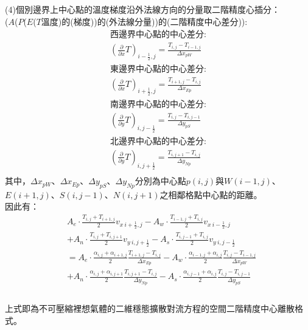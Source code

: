 \documentclass[12pt]{article}
\begin{document}
\noindent (4)個別邊界上中心點的溫度梯度沿外法線方向的分量取二階精度心插分：\\
\noindent ($A$($P$($E$($T$溫度)的(梯度))的(外法線分量))的(二階精度中心差分)):
\begin{equation}
  \begin{split}
    \mbox{西邊界中心點的中心差分:}\\
    (\frac{\partial}{\partial x} T)_{i-\frac{1}{2},j} = \frac{T_{i,j}-T_{i-1,j}}{\Delta x_{pW}} \\
    \mbox{東邊界中心點的中心差分:}\\
    (\frac{\partial}{\partial x} T)_{i+\frac{1}{2},j} = \frac{T_{i+1,j}-T_{i,j}}{\Delta x_{Ep}} \\
    \mbox{南邊界中心點的中心差分:}\\
    (\frac{\partial}{\partial y} T)_{i,j-\frac{1}{2}} = \frac{T_{i,j}-T_{i,j-1}}{\Delta y_{pS}} \\
    \mbox{北邊界中心點的中心差分:}\\
    (\frac{\partial}{\partial y} T)_{i,j+\frac{1}{2}} = \frac{T_{i,j+1}-T_{i,j}}{\Delta y_{Np}} \\
  \end{split}
\end{equation}
\noindent 其中，$\Delta x_{pW}$、$\Delta x_{Ep}$、$\Delta y_{pS}$、$\Delta y_{Np}$分別為中心點$p(i,j)$與$W(i-1,j)$、$E(i+1,j)$、$S(i,j-1)$、$N(i,j+1)$之相鄰格點中心點的距離。\\
\noindent 因此有：
\begin{equation}
\begin{split}
  &A_{e} \cdot \frac{T_{i,j} + T_{i+1,j}}{2} v_{x\ i+\frac{1}{2},j} - A_{w} \cdot \frac{T_{i-1,j} + T_{i,j}}{2} v_{x\ i-\frac{1}{2},j} \\
  &+ A_{n} \cdot \frac{T_{i,j} + T_{i,j+1}}{2} v_{y\ i,j+\frac{1}{2}} - A_{s} \cdot \frac{T_{i,j-1} + T_{i,j}}{2} v_{y\ i,j-\frac{1}{2}}\\
  &= A_{e} \cdot \frac{\alpha_{i,j} + \alpha_{i+1,j}}{2}\frac{T_{i+1,j}-T_{i,j}}{\Delta x_{Ep}}- A_{w} \cdot \frac{\alpha_{i-1,j} + \alpha_{i,j}}{2}\frac{T_{i,j}-T_{i-1,j}}{\Delta x_{pW}} \\
  &+ A_{n} \cdot \frac{\alpha_{i,j} + \alpha_{i,j+1}}{2}\frac{T_{i,j+1}-T_{i,j}}{\Delta y_{Np}} - A_{s} \cdot \frac{\alpha_{i,j-1} + \alpha_{i,j}}{2}\frac{T_{i,j}-T_{i,j-1}}{\Delta y_{pS}} \\
\end{split}
\end{equation}
\\上式即為不可壓縮裡想氣體的二維穩態擴散對流方程的空間二階精度中心離散格式。\\
\end{document}
